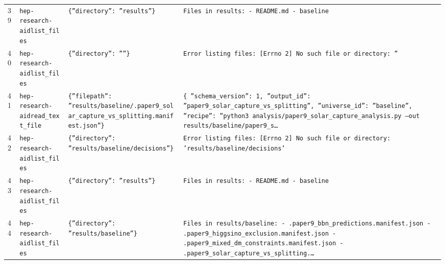 \documentclass[11pt,a4paper]{article}
\begin{document}
\begin{longtable}{@{}p{}p{}p{}p{}@{}}
39 & \texttt{hep-research-aid}\newline\texttt{list\_\allowbreak{}files} & \texttt{\{''directory'':\allowbreak{} ''results''\}\allowbreak{}} & \texttt{Files in results:\allowbreak{}   - README.md   - baseline} \\
40 & \texttt{hep-research-aid}\newline\texttt{list\_\allowbreak{}files} & \texttt{\{''directory'':\allowbreak{} ''''\}\allowbreak{}} & \texttt{Error listing files:\allowbreak{} [Errno 2]\allowbreak{} No such file or directory:\allowbreak{} ''} \\
41 & \texttt{hep-research-aid}\newline\texttt{read\_\allowbreak{}text\_\allowbreak{}file} & \texttt{\{''filepath'':\allowbreak{} ''results/\allowbreak{}baseline/\allowbreak{}.paper9\_\allowbreak{}solar\_\allowbreak{}capture\_\allowbreak{}vs\_\allowbreak{}splitting.manifest.json''\}\allowbreak{}} & \texttt{\{   ''schema\_\allowbreak{}version'':\allowbreak{} 1,\allowbreak{}   ''output\_\allowbreak{}id'':\allowbreak{} ''paper9\_\allowbreak{}solar\_\allowbreak{}capture\_\allowbreak{}vs\_\allowbreak{}splitting'',\allowbreak{}   ''universe\_\allowbreak{}id'':\allowbreak{} ''baseline'',\allowbreak{}   ''recipe'':\allowbreak{} ''python3 analysis/\allowbreak{}paper9\_\allowbreak{}solar\_\allowbreak{}capture\_\allowbreak{}analysis.py --out results/\allowbreak{}baseline/\allowbreak{}paper9\_\allowbreak{}s\ldots{}\allowbreak{}} \\
42 & \texttt{hep-research-aid}\newline\texttt{list\_\allowbreak{}files} & \texttt{\{''directory'':\allowbreak{} ''results/\allowbreak{}baseline/\allowbreak{}decisions''\}\allowbreak{}} & \texttt{Error listing files:\allowbreak{} [Errno 2]\allowbreak{} No such file or directory:\allowbreak{} 'results/\allowbreak{}baseline/\allowbreak{}decisions'} \\
43 & \texttt{hep-research-aid}\newline\texttt{list\_\allowbreak{}files} & \texttt{\{''directory'':\allowbreak{} ''results''\}\allowbreak{}} & \texttt{Files in results:\allowbreak{}   - README.md   - baseline} \\
44 & \texttt{hep-research-aid}\newline\texttt{list\_\allowbreak{}files} & \texttt{\{''directory'':\allowbreak{} ''results/\allowbreak{}baseline''\}\allowbreak{}} & \texttt{Files in results/\allowbreak{}baseline:\allowbreak{}   - .paper9\_\allowbreak{}bbn\_\allowbreak{}predictions.manifest.json   - .paper9\_\allowbreak{}higgsino\_\allowbreak{}exclusion.manifest.json   - .paper9\_\allowbreak{}mixed\_\allowbreak{}dm\_\allowbreak{}constraints.manifest.json   - .paper9\_\allowbreak{}solar\_\allowbreak{}capture\_\allowbreak{}vs\_\allowbreak{}splitting.\ldots{}\allowbreak{}} \\

\end{longtable}
\end{document}
